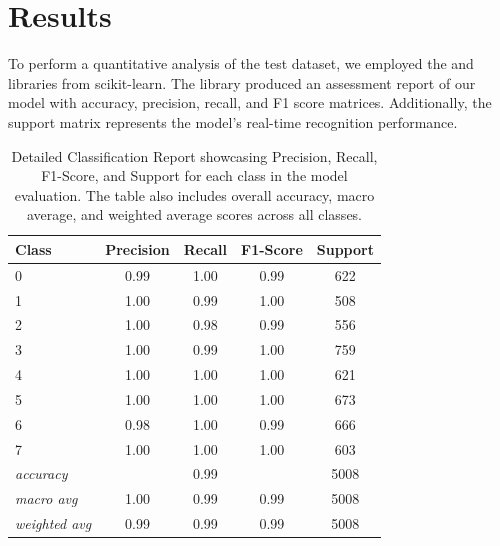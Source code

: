\section{Results}

To perform a quantitative analysis of the test dataset, we employed the   and   libraries from scikit-learn. The  library produced an assessment report of our model with accuracy, precision, recall, and F1 score matrices. Additionally, the support matrix represents the model's real-time recognition performance.



\begin{table}[h]
	\centering
		\caption{Detailed Classification Report showcasing Precision, Recall, F1-Score, and Support for each class in the model evaluation. The table also includes overall accuracy, macro average, and weighted average scores across all classes.}
	\renewcommand{\arraystretch}{1.35} %
	\begin{tabular}{lcccc}
		\hline
		\textbf{Class}       & \textbf{Precision} & \textbf{Recall} & \textbf{F1-Score} & \textbf{Support} \\ \hline
		0                    & 0.99               & 1.00            & 0.99              & 622              \\
		1                    & 1.00               & 0.99            & 1.00              & 508              \\
		2                    & 1.00               & 0.98            & 0.99              & 556              \\
		3                    & 1.00               & 0.99            & 1.00              & 759              \\
		4                    & 1.00               & 1.00            & 1.00              & 621              \\
		5                    & 1.00               & 1.00            & 1.00              & 673              \\
		6                    & 0.98               & 1.00            & 0.99              & 666              \\
		7                    & 1.00               & 1.00            & 1.00              & 603              \\
		\textit{accuracy}    &                   & 0.99            &                 & 5008             \\
		\textit{macro avg}   & 1.00               & 0.99            & 0.99              & 5008             \\
		\textit{weighted avg} & 0.99               & 0.99            & 0.99              & 5008             \\ \hline
	\end{tabular}

	\label{tab:report}
\end{table}

